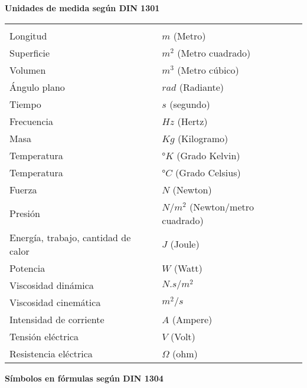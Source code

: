 
\begin{center}
	\textbf{Unidades de medida según DIN 1301}
\end{center}

\begin{mytable}[H]
	\centering
	\begin{tabular}{ll}
		\multicolumn{1}{c}{} & \multicolumn{1}{c}{} \\
		Longitud & $m$ (Metro) \\	
		Superficie & $m^2$ (Metro cuadrado) \\
		Volumen & $m^3$ (Metro cúbico) \\
		Ángulo plano & $rad$ (Radiante) \\
		Tiempo & $s$ (segundo) \\
		Frecuencia & $Hz$ (Hertz) \\
		Masa & $Kg$ (Kilogramo) \\
		Temperatura & °$K$ (Grado Kelvin) \\
		Temperatura & °$C$ (Grado Celsius) \\
		Fuerza & $N$ (Newton) \\
		Presión & $N/m^2$ (Newton/metro cuadrado) \\
		Energía, trabajo, cantidad de calor & $J$ (Joule) \\
		Potencia & $W$ (Watt) \\
		Viscosidad dinámica & $N.s/m^2$ \\
		Viscosidad cinemática & $m^2/s$ \\
		Intensidad de corriente & $A$ (Ampere) \\
		Tensión eléctrica & $V$ (Volt) \\
		Resistencia eléctrica & $\Omega$ (ohm) \\
	\end{tabular}
\end{mytable}

\newpage 
\begin{center}
	\textbf{Símbolos en fórmulas según DIN 1304}
\end{center}

